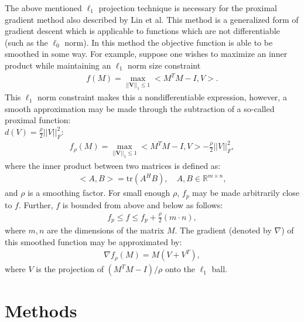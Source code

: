 \documentclass[journal]{IEEEtran}
\begin{document}
The above mentioned $\ell_1$ projection technique is necessary for the proximal gradient method also
described by Lin et al. This method is
a generalized form of gradient descent which is applicable to functions which are not differentiable 
(such as the $\ell_0$ norm). In this method the objective function is able to be smoothed in some way. 
For example, suppose one wishes to maximize an inner product while maintaining an $\ell_1$ norm size 
constraint
\begin{align}
f(M) = \max_{||\mathbf{V}||_1 \leq 1} <M^T M - I, V>.
\end{align}
This $\ell_1$ norm constraint makes this a nondifferentiable expression, however, a smooth approximation
may be made through the subtraction of a so-called proximal function:\\ $d(V) = \frac{\rho}{2}||V||_F^2$:
\begin{align}
    f_\rho(M) = \max_{||\mathbf{V}||_1 \leq 1} <M^T M - I, V> - \frac{\rho}{2}||V||_F^2,
\end{align}
where the inner product between two matrices is defined as:
\begin{align}
    <A, B> = \mathrm{tr}(A^H B), \quad A,B \in \mathbb{R}^{m\times n},
\end{align}
and $\rho$ is a smoothing factor. For small enough $\rho$, $f_p$ may be made arbitrarily close to $f$. 
Further, $f$ is bounded from above and below as follows:
\begin{align}
    f_p \leq f \leq f_p + \frac{\rho}{2}(m \cdot n),
\end{align}
where $m,n$ are the dimensions of the matrix $M$.
The gradient (denoted by $\nabla$) of this smoothed function may be approximated by:
\begin{align}
    \nabla f_\rho(M) = M(V + V^T),
\end{align}
where $V$ is the projection of $(M^T M - I)/\rho$ onto the $\ell_1$ ball.
\section{Methods}
\end{document}

